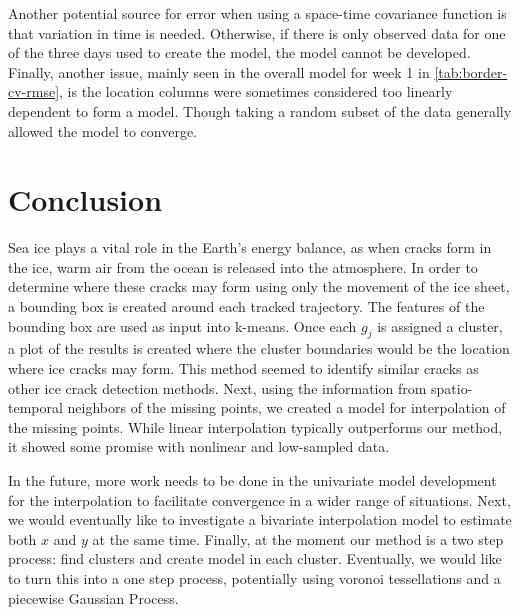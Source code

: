 \documentclass[12pt]{article}
\begin{document}
Another potential source for error when using a space-time covariance
function is that variation in time is needed. Otherwise, if there is
only observed data for one of the three days used to create the model,
the model cannot be developed. Finally, another issue, mainly seen in
the overall model for week 1 in \cref{tab:border-cv-rmse}, is the
location columns were sometimes considered too linearly dependent to
form a model. Though taking a random subset of the data generally
allowed the model to converge.

\hypertarget{conclusion}{%
\section{Conclusion}\label{conclusion}}

Sea ice plays a vital role in the Earth's energy balance, as when cracks
form in the ice, warm air from the ocean is released into the
atmosphere. In order to determine where these cracks may form using only
the movement of the ice sheet, a bounding box is created around each
tracked trajectory. The features of the bounding box are used as input
into k-means. Once each \(g_j\) is assigned a cluster, a plot of the
results is created where the cluster boundaries would be the location
where ice cracks may form. This method seemed to identify similar cracks
as other ice crack detection methods. Next, using the information from
spatio-temporal neighbors of the missing points, we created a model for
interpolation of the missing points. While linear interpolation
typically outperforms our method, it showed some promise with nonlinear
and low-sampled data.

In the future, more work needs to be done in the univariate model
development for the interpolation to facilitate convergence in a wider
range of situations. Next, we would eventually like to investigate a
bivariate interpolation model to estimate both \(x\) and \(y\) at the
same time. Finally, at the moment our method is a two step process: find
clusters and create model in each cluster. Eventually, we would like to
turn this into a one step process, potentially using voronoi
tessellations and a piecewise Gaussian Process.



\end{document}
